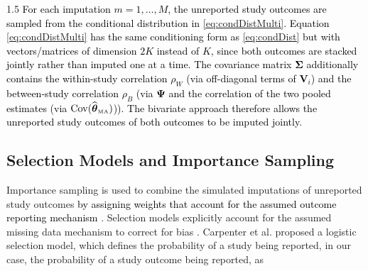 \documentclass{article}
\newcommand{\mycolor}[1]{\textcolor{black}{#1}}
\begin{document}
\begin{spacing}{1.5}
\mycolor{For each imputation $m=1,\ldots,M$, the unreported study outcomes are sampled from the conditional distribution in \eqref{eq:condDistMulti}. Equation \eqref{eq:condDistMulti} has the same conditioning form as \eqref{eq:condDist} but with vectors/matrices of dimension $2K$ instead of $K$, since both outcomes are stacked jointly rather than imputed one at a time. The covariance matrix $\boldsymbol{\Sigma}$ additionally contains the within-study correlation $\rho_W$ (via off-diagonal terms of $\boldsymbol{V}_i$) and the between-study correlation \mycolor{$\rho_B$} (via $\boldsymbol{\Psi}$ and the correlation of the two pooled estimates (via $\operatorname{Cov}(\widehat{\boldsymbol\theta}_{\tiny{\mbox{MA}}})$)).
The bivariate approach therefore allows the unreported study outcomes of both outcomes to be imputed jointly.}


\subsection{Selection Models and Importance Sampling} \label{Importance}
Importance sampling is used to combine the simulated imputations of unreported study outcomes \mycolor{by assigning weights that account for the assumed outcome reporting mechanism} \cite{tabandeh2022review}. Selection models explicitly account for the assumed missing data mechanism to correct for bias \cite{cooper2019handbook, hedges1992modeling}.  Carpenter et al. \cite{carpenter2011assessing} proposed a logistic selection model, which defines the probability of a study being reported, in our case, the probability of a study outcome being reported, as


\end{spacing}
\end{document}
